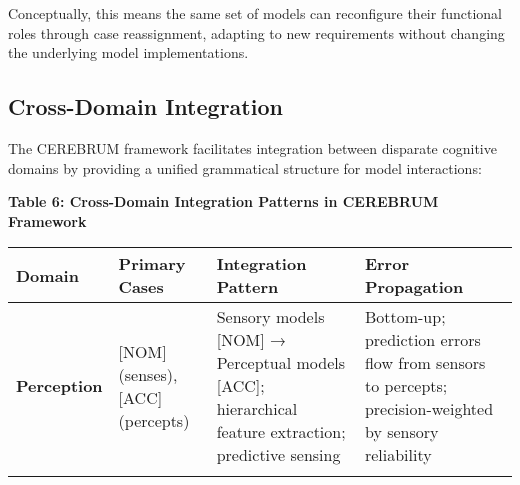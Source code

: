 Conceptually, this means the same set of models can reconfigure their
functional roles through case reassignment, adapting to new requirements
without changing the underlying model implementations.

\hypertarget{cross-domain-integration}{%
\subsection{Cross-Domain Integration}\label{cross-domain-integration}}

The CEREBRUM framework facilitates integration between disparate
cognitive domains by providing a unified grammatical structure for model
interactions:

\textbf{Table 6: Cross-Domain Integration Patterns in CEREBRUM
Framework}

\begin{longtable}[]{@{}llll@{}}
\toprule
\begin{minipage}[b]{0.11\columnwidth}\raggedright
Domain\strut
\end{minipage} & \begin{minipage}[b]{0.20\columnwidth}\raggedright
Primary Cases\strut
\end{minipage} & \begin{minipage}[b]{0.30\columnwidth}\raggedright
Integration Pattern\strut
\end{minipage} & \begin{minipage}[b]{0.27\columnwidth}\raggedright
Error Propagation\strut
\end{minipage}\tabularnewline
\midrule
\endhead
\begin{minipage}[t]{0.11\columnwidth}\raggedright
\textbf{Perception}\strut
\end{minipage} & \begin{minipage}[t]{0.20\columnwidth}\raggedright
{[}NOM{]} (senses), {[}ACC{]} (percepts)\strut
\end{minipage} & \begin{minipage}[t]{0.30\columnwidth}\raggedright
Sensory models {[}NOM{]} → Perceptual models {[}ACC{]}; hierarchical
feature extraction; predictive sensing\strut
\end{minipage} & \begin{minipage}[t]{0.27\columnwidth}\raggedright
Bottom-up; prediction errors flow from sensors to percepts;
precision-weighted by sensory reliability\strut
\end{minipage}\tabularnewline
\begin{minipage}[t]{0.11\columnwidth}\raggedright

\end{minipage}
\end{longtable}
